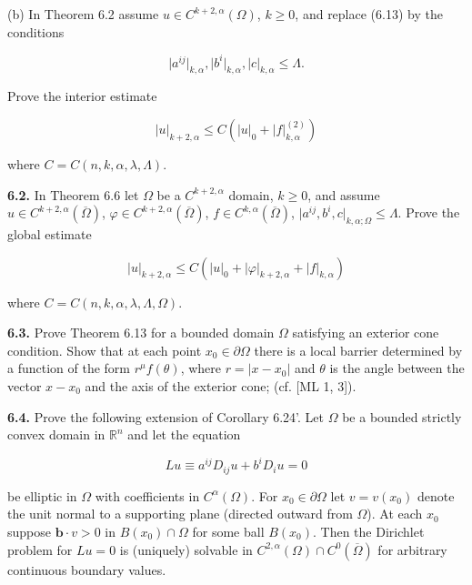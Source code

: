 

(b) In Theorem 6.2 assume $u \in C^{k+2,\alpha}(\Omega)$, $k \geq 0$, and replace (6.13) by the conditions

\[
  \lvert a^{ij}\rvert_{k,\alpha}, \lvert b^i\rvert_{k,\alpha}, \lvert c\rvert_{k,\alpha} \leq \Lambda.
\]

Prove the interior estimate

\[
  \lvert u\rvert_{k+2,\alpha} \leq C(\lvert u\rvert_{0} + \lvert f\rvert_{k,\alpha}^{(2)})
\]

where $C = C(n, k, \alpha, \lambda, \Lambda)$.

\medskip

\noindent \textbf{6.2.} In Theorem 6.6 let $\Omega$ be a $C^{k+2,\alpha}$ domain, $k \geq 0$, and assume $u \in C^{k+2,\alpha}(\overline{\Omega})$,
$\varphi \in C^{k+2,\alpha}(\overline{\Omega})$, $f \in C^{k,\alpha}(\overline{\Omega})$, $\lvert a^{ij}, b^i, c\rvert_{k,\alpha;\Omega} \leq \Lambda$. Prove the global estimate

\[
  \lvert u\rvert_{k+2,\alpha} \leq C(\lvert u\rvert_{0} + \lvert\varphi\rvert_{k+2,\alpha} + \lvert f\rvert_{k,\alpha})
\]

where $C = C(n, k, \alpha, \lambda, \Lambda, \Omega)$.

\medskip

\noindent \textbf{6.3.} Prove Theorem 6.13 for a bounded domain $\Omega$ satisfying an exterior cone
condition. Show that at each point $x_0 \in \partial\Omega$ there is a local barrier determined by
a function of the form $r^\mu f(\theta)$, where $r = \lvert x - x_0\rvert$ and $\theta$ is the angle between the vector
$x - x_0$ and the axis of the exterior cone; (cf. [ML 1, 3]).

\medskip

\noindent \textbf{6.4.} Prove the following extension of Corollary 6.24'. Let $\Omega$ be a bounded strictly
convex domain in $\mathbb{R}^n$ and let the equation

\[
  Lu \equiv a^{ij}D_{ij}u + b^iD_i u = 0
\]

\noindent be elliptic in $\Omega$ with coefficients in $C^\alpha(\Omega)$. For $x_0 \in \partial\Omega$ let $v = v(x_0)$ denote the
unit normal to a supporting plane (directed outward from $\Omega$). At each $x_0$ suppose
$\mathbf{b}\cdot v > 0$ in $B(x_0)\cap\Omega$ for some ball $B(x_0)$. Then the Dirichlet problem for $Lu = 0$
is (uniquely) solvable in $C^{2,\alpha}(\Omega) \cap C^0(\overline{\Omega})$ for arbitrary continuous boundary
values.

